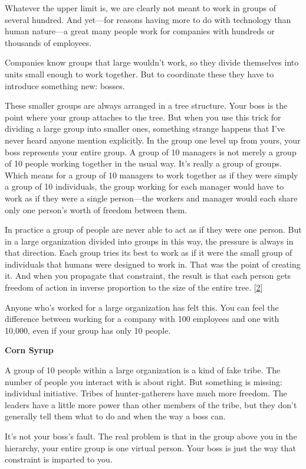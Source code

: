 Whatever the upper limit is, we are clearly not meant to work in groups
of several hundred. And yet---for reasons having more to do with
technology than human nature---a great many people work for companies
with hundreds or thousands of employees.

Companies know groups that large wouldn't work, so they divide
themselves into units small enough to work together. But to coordinate
these they have to introduce something new: bosses.

These smaller groups are always arranged in a tree structure. Your boss
is the point where your group attaches to the tree. But when you use
this trick for dividing a large group into smaller ones, something
strange happens that I've never heard anyone mention explicitly. In the
group one level up from yours, your boss represents your entire group. A
group of 10 managers is not merely a group of 10 people working together
in the usual way. It's really a group of groups. Which means for a group
of 10 managers to work together as if they were simply a group of 10
individuals, the group working for each manager would have to work as if
they were a single person---the workers and manager would each share
only one person's worth of freedom between them.

In practice a group of people are never able to act as if they were one
person. But in a large organization divided into groups in this way, the
pressure is always in that direction. Each group tries its best to work
as if it were the small group of individuals that humans were designed
to work in. That was the point of creating it. And when you propagate
that constraint, the result is that each person gets freedom of action
in inverse proportion to the size of the entire tree.
{[}\hyperref[f2n]{2}{]}

Anyone who's worked for a large organization has felt this. You can feel
the difference between working for a company with 100 employees and one
with 10,000, even if your group has only 10 people.

\textbf{Corn Syrup}

A group of 10 people within a large organization is a kind of fake
tribe. The number of people you interact with is about right. But
something is missing: individual initiative. Tribes of hunter-gatherers
have much more freedom. The leaders have a little more power than other
members of the tribe, but they don't generally tell them what to do and
when the way a boss can.

It's not your boss's fault. The real problem is that in the group above
you in the hierarchy, your entire group is one virtual person. Your boss
is just the way that constraint is imparted to you.

